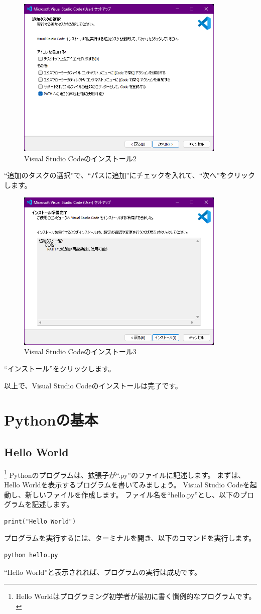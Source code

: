 \documentclass[a4paper,titlepage,dvipdfmx]{jarticle}
\begin{document}
\begin{figure}[H]
  \centering
  \includegraphics[width=10cm]{./figs/vscode-install2.png}
  \caption{Visual Studio Codeのインストール2}
\end{figure}
``追加のタスクの選択''で、``パスに追加''にチェックを入れて、``次へ''をクリックします。

\begin{figure}[H]
  \centering
  \includegraphics[width=10cm]{./figs/vscode-install3.png}
  \caption{Visual Studio Codeのインストール3}
\end{figure}
``インストール''をクリックします。

以上で、Visual Studio Codeのインストールは完了です。

\section{Pythonの基本}
\subsection{Hello World}\footnote{Hello Worldはプログラミング初学者が最初に書く慣例的なプログラムです。}
Pythonのプログラムは、拡張子が``.py''のファイルに記述します。
まずは、Hello Worldを表示するプログラムを書いてみましょう。
Visual Studio Codeを起動し、新しいファイルを作成します。
ファイル名を``hello.py''とし、以下のプログラムを記述します。
\begin{lstlisting}[caption=hello.py]
print("Hello World")
\end{lstlisting}
プログラムを実行するには、ターミナルを開き、以下のコマンドを実行します。
\begin{lstlisting}
python hello.py
\end{lstlisting}
``Hello World''と表示されれば、プログラムの実行は成功です。
\end{document}
